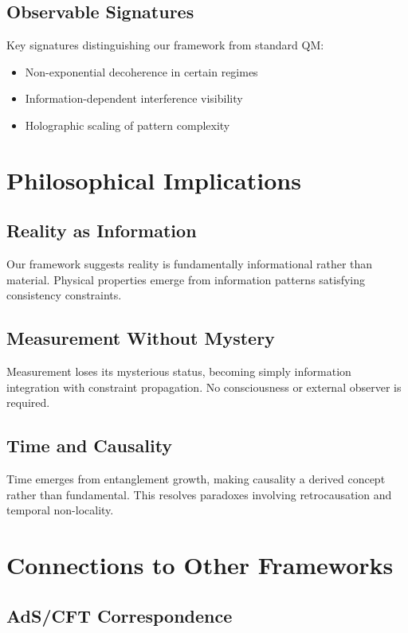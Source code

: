 \documentclass[12pt,a4paper]{article}
\begin{document}
\subsection{Observable Signatures}

Key signatures distinguishing our framework from standard QM:

\begin{itemize}
\item Non-exponential decoherence in certain regimes
\item Information-dependent interference visibility  
\item Holographic scaling of pattern complexity
\end{itemize}

\section{Philosophical Implications}

\subsection{Reality as Information}

Our framework suggests reality is fundamentally informational rather than material. Physical properties emerge from information patterns satisfying consistency constraints.

\subsection{Measurement Without Mystery}

Measurement loses its mysterious status, becoming simply information integration with constraint propagation. No consciousness or external observer is required.

\subsection{Time and Causality}

Time emerges from entanglement growth, making causality a derived concept rather than fundamental. This resolves paradoxes involving retrocausation and temporal non-locality.

\section{Connections to Other Frameworks}

\subsection{AdS/CFT Correspondence}
\end{document}

